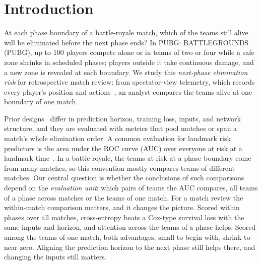 \documentclass[sigconf,anonymous]{acmart}
\begin{document}
\section{Introduction}
\label{sec:introduction}
At each phase boundary of a battle-royale match, which of the teams still alive will be eliminated before the next phase ends? In PUBG: BATTLEGROUNDS (PUBG), up to 100 players compete alone or in teams of two or four while a safe zone shrinks in scheduled phases; players outside it take continuous damage, and a new zone is revealed at each boundary. We study this \emph{next-phase elimination risk} for retrospective match review: from spectator-view telemetry, which records every player's position and actions~\cite{PUBGAPI}, an analyst compares the teams alive at one boundary of one match.

Prior designs~\cite{Sagong25a,KRAFTON} differ in prediction horizon, training loss, inputs, and network structure, and they are evaluated with metrics that pool matches or span a match's whole elimination order. A common evaluation for landmark risk predictors is the area under the ROC curve (AUC) over everyone at risk at a landmark time~\cite{vanHouwelingen07,HeagertyZheng05}. In a battle royale, the teams at risk at a phase boundary come from many matches, so this convention mostly compares teams of different matches. Our central question is whether the conclusions of such comparisons depend on the \emph{evaluation unit}: which pairs of teams the AUC compares, all teams of a phase across matches or the teams of one match. For a match review the within-match comparison matters, and it changes the picture. Scored within phases over all matches, cross-entropy beats a Cox-type survival loss with the same inputs and horizon, and attention across the teams of a phase helps. Scored among the teams of one match, both advantages, small to begin with, shrink to near zero. Aligning the prediction horizon to the next phase still helps there, and changing the inputs still matters.
\end{document}
